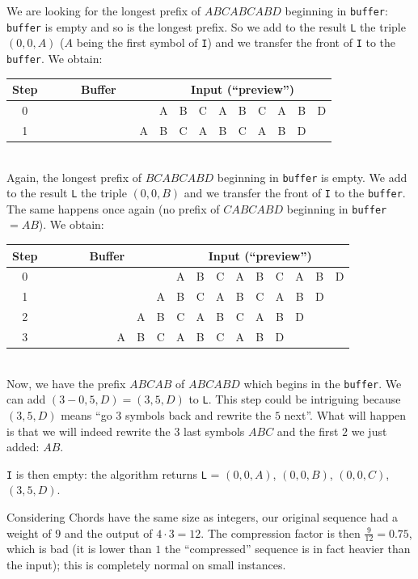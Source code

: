 \documentclass[a4paper,10pt]{article}
\newcommand{\guill}[1]{``#1''}
\begin{document}
We are looking for the longest prefix of $ABCABCABD$ beginning in \texttt{buffer}: \texttt{buffer} is empty and so is the longest prefix. So we add to the result \texttt{L} the triple $(0,0,A)$ ($A$ being the first symbol of \texttt{I}) and we transfer the front of \texttt{I} to the \texttt{buffer}. We obtain: \\

\begin{tabular}{|c|c|c|c|c|c|c|c|c|c|c|c|c|c|c|c|c|c|c|}
\hline
\textbf{Step}&\multicolumn{9}{|c|}{\textbf{Buffer}} & \multicolumn{9}{|c|}{\textbf{Input} (\guill{preview})} \\
\hline
0&&&&&&&&&&A&B&C&A&B&C&A&B&D\\
\hline
1&&&&&&&&&A&B&C&A&B&C&A&B&D&\\
\hline
\end{tabular} \\

Again, the longest prefix of $BCABCABD$ beginning in \texttt{buffer} is empty. We add to the result \texttt{L} the triple $(0,0,B)$ and we transfer the front of \texttt{I} to the \texttt{buffer}. The same happens once again (no prefix of $CABCABD$ beginning in \texttt{buffer}$=AB$). We obtain: \\

\begin{tabular}{|c|c|c|c|c|c|c|c|c|c|c|c|c|c|c|c|c|c|c|}
\hline
\textbf{Step}&\multicolumn{9}{|c|}{\textbf{Buffer}} & \multicolumn{9}{|c|}{\textbf{Input} (\guill{preview})} \\
\hline
0&&&&&&&&&&A&B&C&A&B&C&A&B&D\\
\hline
1&&&&&&&&&A&B&C&A&B&C&A&B&D&\\
\hline
2&&&&&&&&A&B&C&A&B&C&A&B&D&&\\
\hline
3&&&&&&&A&B&C&A&B&C&A&B&D&&&\\
\hline
\end{tabular} \\

Now, we have the prefix $ABCAB$ of $ABCABD$ which begins in the \texttt{buffer}. We can add $(3-0,5,D)=(3,5,D)$ to \texttt{L}. This step could be intriguing because $(3,5,D)$ means \guill{go $3$ symbols back and rewrite the $5$ next}. What will happen is that we will indeed rewrite the $3$ last symbols $ABC$ and the first $2$ we just added: $AB$.

\texttt{I} is then empty: the algorithm returns \texttt{L} = $(0,0,A)$, $(0,0,B)$, $(0,0,C)$, $(3,5,D)$.

Considering Chords have the same size as integers, our original sequence had a weight of $9$ and the output of $4\cdot3=12$. The compression factor is then $\frac{9}{12}=0.75$, which is bad (it is lower than $1$ the \guill{compressed} sequence is in fact heavier than the input); this is completely normal on small instances.
\end{document}
